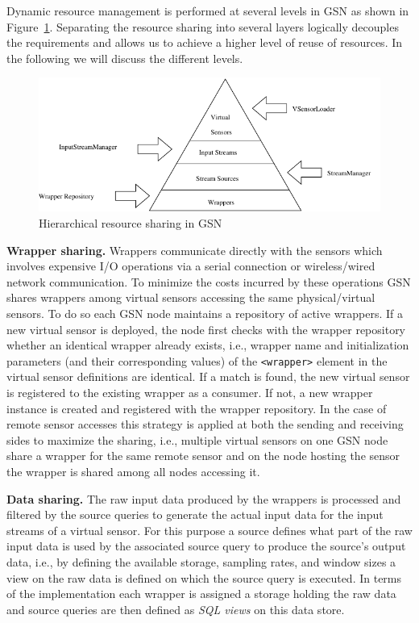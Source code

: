 Dynamic resource management is performed at several levels in GSN as
shown in Figure~\ref{fig:resource-layers}. Separating the resource
sharing into several layers logically decouples the requirements and
allows us to achieve a higher level of reuse of resources. In the
following we will discuss the different levels.

\begin{figure}%
  \centering
  \includegraphics[width=0.5\columnwidth]{ch-gsn-figures/gsn-reuse}
  \caption{Hierarchical resource sharing in GSN}
  \label{fig:resource-layers}
\end{figure}

\textbf{Wrapper sharing.} Wrappers communicate directly with the sensors which
involves expensive I/O operations via a serial connection or wireless/wired
network communication. To minimize the costs incurred by these operations GSN
shares wrappers among virtual sensors accessing the same physical/virtual
sensors. To do so each GSN node maintains a repository of active wrappers. If a
new virtual sensor is deployed, the node first checks with the wrapper
repository whether an identical wrapper already exists, i.e., wrapper name and
initialization parameters (and their corresponding values) of the \verb|<wrapper>| element in the virtual sensor
definitions are identical. If a match is found, the new virtual sensor is
registered to the existing wrapper as a consumer. If not, a new wrapper
instance is created and registered with the wrapper repository. In the case of
remote sensor accesses this strategy is applied at both the sending and
receiving sides to maximize the sharing, i.e., multiple virtual sensors on one
GSN node share a wrapper for the same remote sensor and on the node hosting the
sensor the wrapper is shared among all nodes accessing it.

\textbf{Data sharing.} The raw input data produced by the wrappers is processed
and filtered by the source queries to generate the actual input data for the
input streams of a virtual sensor. For this purpose a source defines
what part of the raw input data is used by the associated source query
to produce the source's output data, i.e., by defining the available
storage, sampling rates, and window sizes a view on the raw data is defined on
which the source query is executed. In terms of the implementation each
wrapper is assigned a storage holding the raw data and source queries
are then defined as \emph{SQL views} on this data store.

